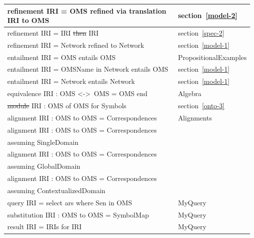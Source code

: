 \documentclass[10pt,fleqn,final]{scrreprt}
\newcommand*{\lessthan}{<}
\newcommand*{\greaterthan}{>}
\providecommand{\DIFadd}[1]{{\protect\color{blue}\uwave{#1}}} %
\providecommand{\DIFdel}[1]{{\protect\color{red}\sout{#1}}}                      %
\providecommand{\DIFaddbegin}{} %
\providecommand{\DIFaddend}{} %
\providecommand{\DIFdelbegin}{} %
\providecommand{\DIFdelend}{} %
\begin{document}
\begin{tabular}{|l|l|}
refinement IRI = OMS refined via translation IRI to OMS & section~\ref{model-2} \\\hline
refinement IRI = IRI \DIFdelbegin \DIFdel{then }\DIFdelend \DIFaddbegin \DIFadd{refined to }\DIFaddend IRI & section~\ref{spec-2} \\\hline
refinement IRI = Network refined to Network & section~\ref{model-1} \\\hline
entailment IRI = OMS entails OMS & PropositionalExamples \\\hline
entailment IRI = OMSName in Network entails OMS & section~\ref{model-1}\\\hline
entailment IRI = Network entails Network & section~\ref{model-1}\\\hline
equivalence IRI : OMS \lessthan-\greaterthan\ OMS = OMS end  &  Algebra \\\hline
\DIFdelbegin \DIFdel{module }\DIFdelend \DIFaddbegin \DIFadd{cons-ext }\DIFaddend IRI : OMS of OMS for Symbols  & section~\ref{onto-3} \\\hline
alignment IRI : OMS to OMS = Correspondences  & Alignments \\\hline
alignment IRI : OMS to OMS = Correspondences & \\
\qquad assuming SingleDomain & \cite{OM2014} \\\hline
alignment IRI : OMS to OMS = Correspondences & \\
\qquad assuming GlobalDomain & \cite{OM2014} \\\hline
alignment IRI : OMS to OMS = Correspondences & \\
\qquad assuming ContextualizedDomain & \cite{OM2014} \\\hline
query IRI = select ars where Sen in OMS & MyQuery\\\hline
substitution IRI : OMS to OMS = SymbolMap & MyQuery\\\hline
result IRI = IRIs for IRI & MyQuery\\\hline
\end{tabular}
\end{document}
